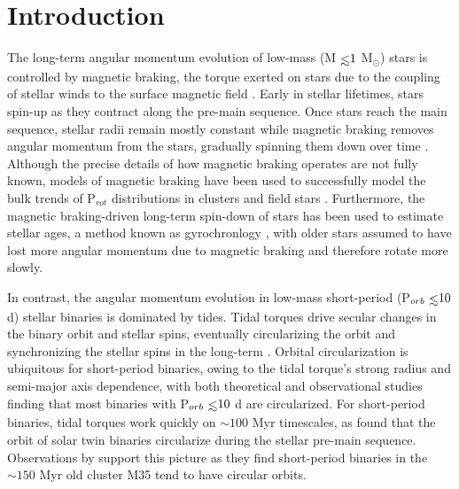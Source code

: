 \documentclass[twocolumn]{aastex61}
\def\lsim{~\rlap{$<$}{\lower 1.0ex\hbox{$\sim$}}}
\newcommand{\kepler}[0]{\textit{Kepler}\xspace}
\begin{document}



\section{Introduction} \label{sec:intro}

The long-term angular momentum evolution of low-mass (M$\lsim 1$ M$_{\odot}$) stars is controlled by magnetic braking, the torque exerted on stars due to the coupling of stellar winds to the surface magnetic field \citep{Dunn1961,Mestel1968}. Early in stellar lifetimes, stars spin-up as they contract along the pre-main sequence.  Once stars reach the main sequence, stellar radii remain mostly constant while magnetic braking removes angular momentum from the stars, gradually spinning them down over time \citep{Skumanich1972}. Although the precise details of how magnetic braking operates are not fully known, models of magnetic braking have been used to successfully model the bulk trends of P$_{rot}$ distributions in clusters \citep[e.g. Praesepe, ][]{Matt2015,Douglas2017} and field stars \citep[e.g. the \kepler field, ][]{Reiners2012,Matt2015,vanSaders2018}. Furthermore, the magnetic braking-driven long-term spin-down of stars has been used to estimate stellar ages, a method known as gyrochronlogy \citep{Skumanich1972,Barnes2003,Barnes2007,Mamajek2008,Barnes2010}, with older stars assumed to have lost more angular momentum due to magnetic braking and therefore rotate more slowly.

In contrast, the angular momentum evolution in low-mass short-period (P$_{orb} \lsim 10$ d) stellar binaries is dominated by tides.  Tidal torques drive secular changes in the binary orbit and stellar spins, eventually circularizing the orbit and synchronizing the stellar spins in the long-term \citep{Counselman1973}. Orbital circularization is ubiquitous for short-period binaries, owing to the tidal torque's strong radius and semi-major axis dependence, with both theoretical \citep[e.g.][]{Zahn1989,Claret1995} and observational \citep[e.g.][]{Meibom2005,Mazeh2008,Lurie2017} studies finding that most binaries with P$_{orb} \lsim 10$ d are circularized. For short-period binaries, tidal torques work quickly on ${\sim}100$ Myr timescales, as \citet{Zahn1989} found that the orbit of solar twin binaries circularize during the stellar pre-main sequence.  Observations by \citet{Meibom2005} support this picture as they find short-period binaries in the ${\sim}150$ Myr old cluster M35 tend to have circular orbits.
\end{document}

